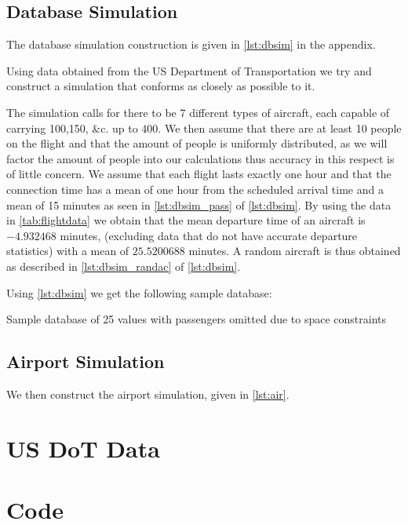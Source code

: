\documentclass[titlepage]{article}
\numberwithin{equation}{section}
\begin{document}
\subsection{Database Simulation}
The database simulation construction is given in \autoref{lst:dbsim} in the appendix.

Using data obtained from the US Department of Transportation \cite{USDoTData} we try and construct a simulation that conforms as closely as possible to it. 

The simulation calls for there to be 7 different types of aircraft, each capable of carrying 100,150, \&c. up to 400. We then assume that there are  at least 10 people on the flight and that the amount of people is uniformly distributed, as we will factor the amount of people into our calculations thus accuracy in this respect is of little concern.
We assume that each flight lasts exactly one hour and that the connection time has a mean of one hour from the scheduled arrival time and a mean of 15 minutes as seen in \autoref{lst:dbsim_pass} of \autoref{lst:dbsim}. By using the data in \autoref{tab:flightdata} we obtain that the mean departure time of an aircraft is $-4.932468$ minutes, (excluding data that do not have accurate departure statistics) with a mean of $25.5200688$ minutes. A random aircraft is thus obtained as described in \autoref{lst:dbsim_randac} of \autoref{lst:dbsim}.

Using \autoref{lst:dbsim} we get the following sample database:

\begin{table}[h!]
\caption{Sample database of 25 values with passengers omitted due to space constraints}
\label{tab:sampledata}
\centering
{}
\end{table}

\subsection{Airport Simulation}
We then construct the airport simulation, given in \autoref{lst:air}.

\newpage
\begin{appendices}
\section{US DoT Data}

\DTLsetseparator{,}


\newpage
\section{Code}

\newpage


\end{appendices}

\newpage
{}


\end{document}
